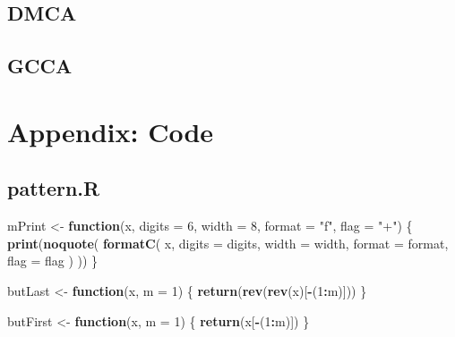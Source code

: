 \documentclass[
  12pt,
]{article}
\newenvironment{Shaded}{\begin{snugshade}}{\end{snugshade}}
\newcommand{\AttributeTok}[1]{\textcolor[rgb]{0.13,0.29,0.53}{#1}}
\newcommand{\ControlFlowTok}[1]{\textcolor[rgb]{0.13,0.29,0.53}{\textbf{#1}}}
\newcommand{\DecValTok}[1]{\textcolor[rgb]{0.00,0.00,0.81}{#1}}
\newcommand{\FunctionTok}[1]{\textcolor[rgb]{0.13,0.29,0.53}{\textbf{#1}}}
\newcommand{\NormalTok}[1]{#1}
\newcommand{\OtherTok}[1]{\textcolor[rgb]{0.56,0.35,0.01}{#1}}
\newcommand{\SpecialCharTok}[1]{\textcolor[rgb]{0.81,0.36,0.00}{\textbf{#1}}}
\newcommand{\StringTok}[1]{\textcolor[rgb]{0.31,0.60,0.02}{#1}}
\begin{document}
\subsection{DMCA}\label{dmca}

\subsection{GCCA}\label{gcca}

\section{Appendix: Code}\label{appendix-code}

\subsection{pattern.R}\label{pattern.r}

\begin{Shaded}
\begin{Highlighting}[]
\NormalTok{mPrint }\OtherTok{\textless{}{-}} \ControlFlowTok{function}\NormalTok{(x,}
                   \AttributeTok{digits =} \DecValTok{6}\NormalTok{,}
                   \AttributeTok{width =} \DecValTok{8}\NormalTok{,}
                   \AttributeTok{format =} \StringTok{"f"}\NormalTok{,}
                   \AttributeTok{flag =} \StringTok{"+"}\NormalTok{) \{}
  \FunctionTok{print}\NormalTok{(}\FunctionTok{noquote}\NormalTok{(}
    \FunctionTok{formatC}\NormalTok{(}
\NormalTok{      x,}
      \AttributeTok{digits =}\NormalTok{ digits,}
      \AttributeTok{width =}\NormalTok{ width,}
      \AttributeTok{format =}\NormalTok{ format,}
      \AttributeTok{flag =}\NormalTok{ flag}
\NormalTok{    )}
\NormalTok{  ))}
\NormalTok{\}}

\NormalTok{butLast }\OtherTok{\textless{}{-}} \ControlFlowTok{function}\NormalTok{(x, }\AttributeTok{m =} \DecValTok{1}\NormalTok{) \{}
  \FunctionTok{return}\NormalTok{(}\FunctionTok{rev}\NormalTok{(}\FunctionTok{rev}\NormalTok{(x)[}\SpecialCharTok{{-}}\NormalTok{(}\DecValTok{1}\SpecialCharTok{:}\NormalTok{m)]))}
\NormalTok{\}}

\NormalTok{butFirst }\OtherTok{\textless{}{-}} \ControlFlowTok{function}\NormalTok{(x, }\AttributeTok{m =} \DecValTok{1}\NormalTok{) \{}
  \FunctionTok{return}\NormalTok{(x[}\SpecialCharTok{{-}}\NormalTok{(}\DecValTok{1}\SpecialCharTok{:}\NormalTok{m)])}
\NormalTok{\}}
\end{Highlighting}
\end{Shaded}
\end{document}

